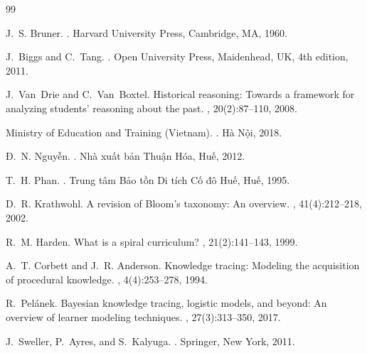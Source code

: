 \documentclass[11pt,a4paper]{article}
\begin{document}
\begin{thebibliography}{99}

J.~S. Bruner.
.
\newblock Harvard University Press, Cambridge, MA, 1960.

J.~Biggs and C.~Tang.
.
\newblock Open University Press, Maidenhead, UK, 4th edition, 2011.

J.~Van~Drie and C.~Van~Boxtel.
\newblock Historical reasoning: Towards a framework for analyzing students' reasoning about the past.
, 20(2):87--110, 2008.

Ministry of Education and Training (Vietnam).
.
\newblock Hà Nội, 2018.

Đ.~N. Nguyễn.
.
\newblock Nhà xuất bản Thuận Hóa, Huế, 2012.

T.~H. Phan.
.
\newblock Trung tâm Bảo tồn Di tích Cố đô Huế, Huế, 1995.

D.~R. Krathwohl.
\newblock A revision of Bloom's taxonomy: An overview.
, 41(4):212--218, 2002.

R.~M. Harden.
\newblock What is a spiral curriculum?
, 21(2):141--143, 1999.

A.~T. Corbett and J.~R. Anderson.
\newblock Knowledge tracing: Modeling the acquisition of procedural knowledge.
, 4(4):253--278, 1994.

R.~Pel{\'a}nek.
\newblock Bayesian knowledge tracing, logistic models, and beyond: An overview of learner modeling techniques.
, 27(3):313--350, 2017.

J.~Sweller, P.~Ayres, and S.~Kalyuga.
.
\newblock Springer, New York, 2011.

\end{thebibliography}
\end{document}
